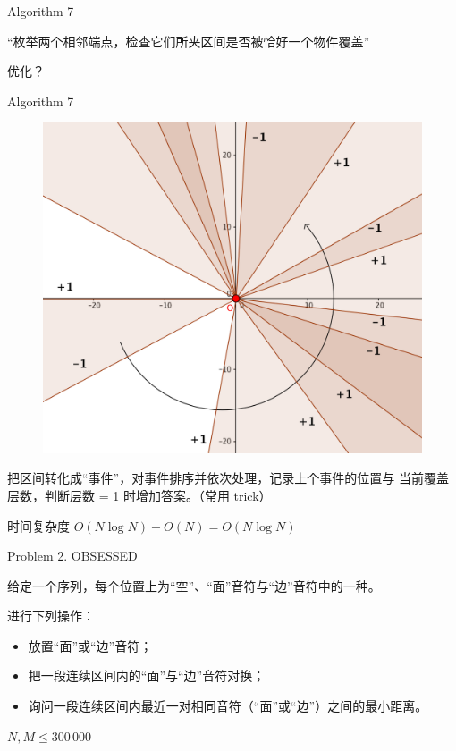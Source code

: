 \documentclass[UTF8]{beamer}
\begin{document}
\begin{frame}{Algorithm 7}

“枚举两个相邻端点，检查它们所夹区间是否被恰好一个物件覆盖”\newline\newline

优化？

\end{frame}

\begin{frame}{Algorithm 7}

\begin{figure}[h]\centering
\includegraphics[scale=0.333]{a5.png}
\end{figure}

把区间转化成“事件”，对事件排序并依次处理，记录上个事件的位置与%
当前覆盖层数，判断层数 = 1 时增加答案。（常用 trick）

时间复杂度 $O(N \log N) + O(N) = O(N \log N)$

\end{frame}


\begin{frame}{Problem 2. OBSESSED}

给定一个序列，每个位置上为“空”、“面”音符与“边”音符中的一种。

进行下列操作：
\begin{itemize}
    \item 放置“面”或“边”音符；
    \item 把一段连续区间内的“面”与“边”音符对换；
    \item 询问一段连续区间内最近一对相同音符（“面”或“边”）之间的最小距离。
\end{itemize}

$N, M \leq 300\,000$

\end{frame}
\end{document}
